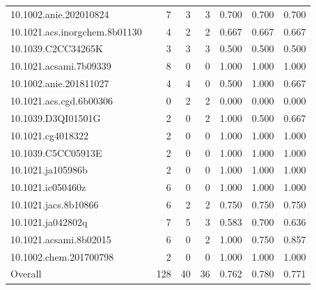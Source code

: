 \begin{table}[t]
\begin{tabular}{lrrrrrr}
10.1002.anie.202010824~\cite{gong_facedirected_2020}          &  7 &  3 &  3 & 0.700 & 0.700 & 0.700 \\
10.1021.acs.inorgchem.8b01130~\cite{gosselin_design_2018}     &  4 &  2 &  2 & 0.667 & 0.667 & 0.667 \\
10.1039.C2CC34265K~\cite{du_giant_2012}                       &  3 &  3 &  3 & 0.500 & 0.500 & 0.500 \\
10.1021.acsami.7b09339~\cite{park_chromiumii_2017}            &  8 &  0 &  0 & 1.000 & 1.000 & 1.000 \\
10.1002.anie.201811027~\cite{gong_bottomup_2019}              &  4 &  4 &  0 & 0.500 & 1.000 & 0.667 \\
10.1021.acs.cgd.6b00306~\cite{rathnayake_investigating_2016}  &  0 &  2 &  2 & 0.000 & 0.000 & 0.000 \\
10.1039.D3QI01501G~\cite{yang_efficient_2023}                 &  2 &  0 &  2 & 1.000 & 0.500 & 0.667 \\
10.1021.cg4018322~\cite{paul_secondary_2014}                  &  2 &  0 &  0 & 1.000 & 1.000 & 1.000 \\
10.1039.C5CC05913E~\cite{augustyniak_vanadium_2015}           &  2 &  0 &  0 & 1.000 & 1.000 & 1.000 \\
10.1021.ja105986b~\cite{zheng_cubic_2010}                     &  2 &  0 &  0 & 1.000 & 1.000 & 1.000 \\
10.1021.ic050460z~\cite{ke_synthesis_2005}                    &  6 &  0 &  0 & 1.000 & 1.000 & 1.000 \\
10.1021.jacs.8b10866~\cite{zhang_self-assembly_2018}          &  6 &  2 &  2 & 0.750 & 0.750 & 0.750 \\
10.1021.ja042802q~\cite{sudik_design_2005}                    &  7 &  5 &  3 & 0.583 & 0.700 & 0.636 \\
10.1021.acsami.8b02015~\cite{barreda_ligand-based_2018}       &  6 &  0 &  2 & 1.000 & 0.750 & 0.857 \\
10.1002.chem.201700798~\cite{ju_coordination_2017}            &  2 &  0 &  0 & 1.000 & 1.000 & 1.000 \\
\hline
Overall                                                        & 128 & 40 & 36 & 0.762 & 0.780 & 0.771 \\
\hline
\end{tabular}
\end{table}
